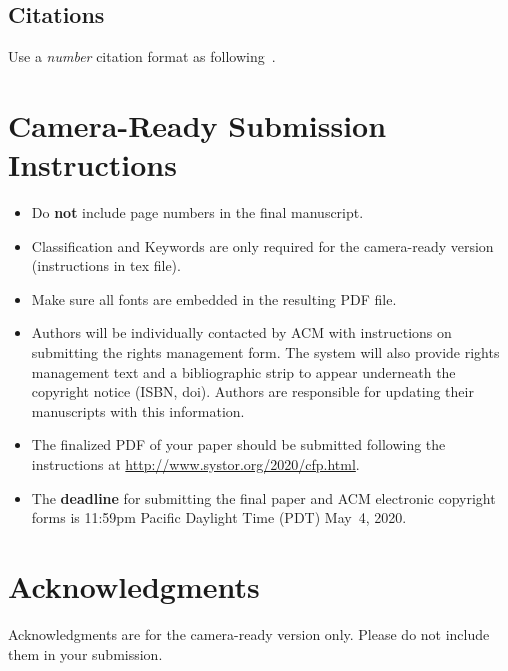 \documentclass[sigconf,anonymous,10pt]{acmart}
\begin{document}
\subsection{Citations}

Use a \emph{number} citation format as following~\cite{lamport94,nicepaper,nicepaper2}.

\section{Camera-Ready Submission Instructions}
\begin{itemize}
	
	\item
	Do \textbf{not} include page numbers in the final manuscript.
	
	\item
	Classification and Keywords are only required for the camera-ready version (instructions in tex file).
	
	\item
	Make sure all fonts are embedded in the resulting PDF file.
	
	\item
	Authors will be individually contacted by ACM with instructions on submitting the rights management form. The system will also provide rights management text and a bibliographic strip to appear underneath the copyright notice (ISBN, doi). Authors are responsible for updating their manuscripts with this information.
	
	\item
	The finalized PDF of your paper should be submitted following the instructions at
	\url{http://www.systor.org/2020/cfp.html}.
	
	\item
	The \textbf{deadline} for submitting the final paper and ACM electronic copyright forms is 11:59pm Pacific Daylight Time (PDT) May~4, 2020.
\end{itemize}

\section*{Acknowledgments}
Acknowledgments are for the camera-ready version only. Please do not include them in your submission.



\end{document}
